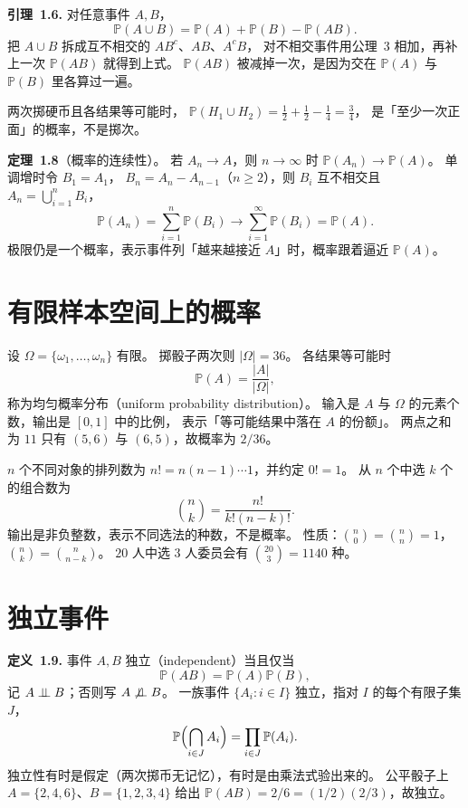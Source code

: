 \noindent\textbf{引理~1.6.}
对任意事件 $A,B$，
\begin{equation}
\mathbb{P}(A\cup B)=\mathbb{P}(A)+\mathbb{P}(B)-\mathbb{P}(AB).
\end{equation}
把 $A\cup B$ 拆成互不相交的 $AB^{c}$、$AB$、$A^{c}B$，
对不相交事件用公理~3 相加，再补上一次 $\mathbb{P}(AB)$ 就得到上式。
$\mathbb{P}(AB)$ 被减掉一次，是因为交在 $\mathbb{P}(A)$ 与 $\mathbb{P}(B)$ 里各算过一遍。

两次掷硬币且各结果等可能时，
$\mathbb{P}(H_1\cup H_2)=\tfrac12+\tfrac12-\tfrac14=\tfrac34$，
是「至少一次正面」的概率，不是掷次。

\noindent\textbf{定理~1.8}（概率的连续性）。
若 $A_n\to A$，则 $n\to\infty$ 时 $\mathbb{P}(A_n)\to\mathbb{P}(A)$。
单调增时令 $B_1=A_1$，
$B_n=A_n-A_{n-1}$（$n\ge 2$），则 $B_i$ 互不相交且
$A_n=\bigcup_{i=1}^{n}B_i$，
\[
\mathbb{P}(A_n)=\sum_{i=1}^{n}\mathbb{P}(B_i)
\to\sum_{i=1}^{\infty}\mathbb{P}(B_i)=\mathbb{P}(A).
\]
极限仍是一个概率，表示事件列「越来越接近 $A$」时，概率跟着逼近 $\mathbb{P}(A)$。

\section{有限样本空间上的概率}

设 $\Omega=\{\omega_1,\ldots,\omega_n\}$ 有限。
掷骰子两次则 $\lvert\Omega\rvert=36$。
各结果等可能时
\begin{equation}
\mathbb{P}(A)=\frac{\lvert A\rvert}{\lvert\Omega\rvert},
\end{equation}
称为均匀概率分布（uniform probability distribution）。
输入是 $A$ 与 $\Omega$ 的元素个数，输出是 $[0,1]$ 中的比例，
表示「等可能结果中落在 $A$ 的份额」。
两点之和为 $11$ 只有 $(5,6)$ 与 $(6,5)$，故概率为 $2/36$。

$n$ 个不同对象的排列数为 $n!=n(n-1)\cdots 1$，并约定 $0!=1$。
从 $n$ 个中选 $k$ 个的组合数为
\begin{equation}
\binom{n}{k}=\frac{n!}{k!(n-k)!}.
\end{equation}
输出是非负整数，表示不同选法的种数，不是概率。
性质：$\binom{n}{0}=\binom{n}{n}=1$，$\binom{n}{k}=\binom{n}{n-k}$。
$20$ 人中选 $3$ 人委员会有 $\binom{20}{3}=1140$ 种。

\section{独立事件}

\noindent\textbf{定义~1.9.}
事件 $A,B$ 独立（independent）当且仅当
\begin{equation}
\mathbb{P}(AB)=\mathbb{P}(A)\mathbb{P}(B),
\end{equation}
记 $A\mathrel{\perp\mspace{-9mu}\perp} B$；否则写 $A\not\mathrel{\perp\mspace{-9mu}\perp} B$。
一族事件 $\{A_i:i\in I\}$ 独立，指对 $I$ 的每个有限子集 $J$，
\[
\mathbb{P}\Bigl(\bigcap_{i\in J}A_i\Bigr)=\prod_{i\in J}\mathbb{P}(A_i).
\]
独立性有时是假定（两次掷币无记忆），有时是由乘法式验出来的。
公平骰子上 $A=\{2,4,6\}$、$B=\{1,2,3,4\}$ 给出
$\mathbb{P}(AB)=2/6=(1/2)(2/3)$，故独立。

